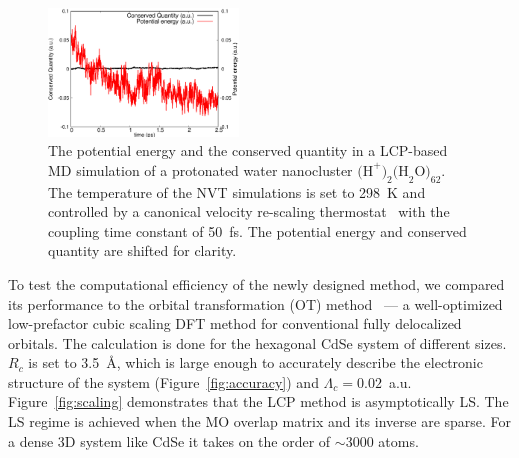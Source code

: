 \documentclass[aps,prl,twocolumn,reprint,amsmath,amssymb]{revtex4-1}
\begin{document}

\begin{figure}
\includegraphics[width=0.45\textwidth]{const.eps}
\caption{The potential energy and the conserved quantity in a LCP-based MD simulation of a protonated water nanocluster $\text{(H}^{+}\text{)}_2\text{(H}_2\text{O)}_{62}$. The temperature of the NVT simulations is set to 298~K and controlled by a canonical velocity re-scaling thermostat~\cite{bussi2007canonical} with the coupling time constant of 50~fs. The potential energy and conserved quantity are shifted for clarity.}
\label{fig:md}
\end{figure}



To test the computational efficiency of the newly designed method, we compared its performance to the orbital transformation (OT) method~\cite{weber2008direct,vandevondele2003efficient} --- a well-optimized low-prefactor cubic scaling DFT method for conventional fully delocalized orbitals. The calculation is done for the hexagonal CdSe system of different sizes. $R_c$ is set to 3.5~{\AA}, which is large enough to accurately describe the electronic structure of the system (Figure~\ref{fig:accuracy}) and $\Lambda_c = 0.02$~a.u. Figure~\ref{fig:scaling} demonstrates that the LCP method is asymptotically LS. The LS regime is achieved when the MO overlap matrix and its inverse are sparse. For a dense 3D system like CdSe it takes on the order of $\sim$3000 atoms. 
\end{document}

